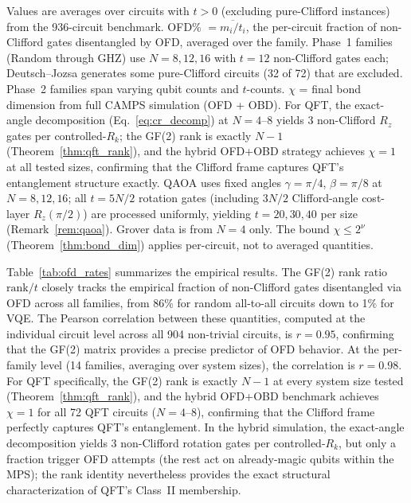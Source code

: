\documentclass[a4paper,twocolumn,11pt]{quantumarticle}
\begin{document}
\begin{table}[t]
\footnotesize{Values are averages over circuits with $t > 0$ (excluding pure-Clifford instances) from the 936-circuit benchmark. OFD\% $= \overline{m_i/t_i}$, the per-circuit fraction of non-Clifford gates disentangled by OFD, averaged over the family. Phase~1 families (Random through GHZ) use $N = 8, 12, 16$ with $t = 12$ non-Clifford gates each; Deutsch--Jozsa generates some pure-Clifford circuits (32 of 72) that are excluded. Phase~2 families span varying qubit counts and $t$-counts. $\chi$ = final bond dimension from full CAMPS simulation (OFD + OBD). For QFT, the exact-angle decomposition (Eq.~\eqref{eq:cr_decomp}) at $N = 4$--$8$ yields 3 non-Clifford $R_z$ gates per controlled-$R_k$; the GF(2) rank is exactly $N - 1$ (Theorem~\ref{thm:qft_rank}), and the hybrid OFD+OBD strategy achieves $\chi = 1$ at all tested sizes, confirming that the Clifford frame captures QFT's entanglement structure exactly. QAOA uses fixed angles $\gamma = \pi/4$, $\beta = \pi/8$ at $N = 8, 12, 16$; all $t = 5N/2$ rotation gates (including $3N/2$ Clifford-angle cost-layer $R_z(\pi/2)$) are processed uniformly, yielding $t = 20, 30, 40$ per size (Remark~\ref{rem:qaoa}).
Grover data is from $N = 4$ only. The bound $\chi \le 2^\nu$ (Theorem~\ref{thm:bond_dim}) applies per-circuit, not to averaged quantities.}
\end{table}

Table~\ref{tab:ofd_rates} summarizes the empirical results.
The GF(2) rank ratio $\mathrm{rank}/t$ closely tracks the empirical fraction of non-Clifford gates disentangled via OFD across all families, from 86\% for random all-to-all circuits down to 1\% for VQE.
The Pearson correlation between these quantities, computed at the individual circuit level across all 904 non-trivial circuits, is $r = 0.95$, confirming that the GF(2) matrix provides a precise predictor of OFD behavior.
At the per-family level (14 families, averaging over system sizes), the correlation is $r = 0.98$.
For QFT specifically, the GF(2) rank is exactly $N - 1$ at every system size tested (Theorem~\ref{thm:qft_rank}), and the hybrid OFD+OBD benchmark achieves $\chi = 1$ for all 72 QFT circuits ($N = 4$--$8$), confirming that the Clifford frame perfectly captures QFT's entanglement.
In the hybrid simulation, the exact-angle decomposition yields 3 non-Clifford rotation gates per controlled-$R_k$, but only a fraction trigger OFD attempts (the rest act on already-magic qubits within the MPS); the rank identity nevertheless provides the exact structural characterization of QFT's Class~II membership.
\end{document}
